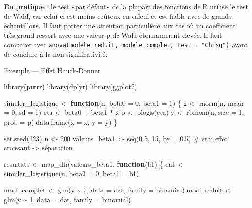 \documentclass[
  french,
  letterpaper,
  DIV=11,
  numbers=noendperiod]{scrreprt}
\newenvironment{Shaded}{\begin{snugshade}}{\end{snugshade}}
\newcommand{\AttributeTok}[1]{\textcolor[rgb]{0.40,0.45,0.13}{#1}}
\newcommand{\CommentTok}[1]{\textcolor[rgb]{0.37,0.37,0.37}{#1}}
\newcommand{\ControlFlowTok}[1]{\textcolor[rgb]{0.00,0.23,0.31}{\textbf{#1}}}
\newcommand{\DecValTok}[1]{\textcolor[rgb]{0.68,0.00,0.00}{#1}}
\newcommand{\FloatTok}[1]{\textcolor[rgb]{0.68,0.00,0.00}{#1}}
\newcommand{\FunctionTok}[1]{\textcolor[rgb]{0.28,0.35,0.67}{#1}}
\newcommand{\NormalTok}[1]{\textcolor[rgb]{0.00,0.23,0.31}{#1}}
\newcommand{\OtherTok}[1]{\textcolor[rgb]{0.00,0.23,0.31}{#1}}
\newcommand{\SpecialCharTok}[1]{\textcolor[rgb]{0.37,0.37,0.37}{#1}}
\begin{document}
\textbf{En pratique} : le test «par défaut» de la plupart des fonctions
de R utilise le test de Wald, car celui-ci est moins coûteux en calcul
et est fiable avec de grands échantillons. Il faut porter une attention
particulière aux cas où un coefficient très grand ressort avec une
valeur-p de Wald étonnamment élevée. Il faut comparer avec
\texttt{anova(modele\_reduit,\ modele\_complet,\ test\ =\ "Chisq")}
avant de conclure à la non-significativité.

{Exemple --- Effet Hauck-Donner}

\begin{Shaded}
\begin{Highlighting}[]
\FunctionTok{library}\NormalTok{(purrr)}
\FunctionTok{library}\NormalTok{(dplyr)}
\FunctionTok{library}\NormalTok{(ggplot2)}

\NormalTok{simuler\_logistique }\OtherTok{\textless{}{-}} \ControlFlowTok{function}\NormalTok{(n, }\AttributeTok{beta0 =} \DecValTok{0}\NormalTok{, }\AttributeTok{beta1 =} \DecValTok{1}\NormalTok{) \{}
\NormalTok{  x }\OtherTok{\textless{}{-}} \FunctionTok{rnorm}\NormalTok{(n, }\AttributeTok{mean =} \DecValTok{0}\NormalTok{, }\AttributeTok{sd =} \DecValTok{1}\NormalTok{)}
\NormalTok{  eta }\OtherTok{\textless{}{-}}\NormalTok{ beta0 }\SpecialCharTok{+}\NormalTok{ beta1 }\SpecialCharTok{*}\NormalTok{ x}
\NormalTok{  p }\OtherTok{\textless{}{-}} \FunctionTok{plogis}\NormalTok{(eta)}
\NormalTok{  y }\OtherTok{\textless{}{-}} \FunctionTok{rbinom}\NormalTok{(n, }\AttributeTok{size =} \DecValTok{1}\NormalTok{, }\AttributeTok{prob =}\NormalTok{ p)}
  \FunctionTok{data.frame}\NormalTok{(}\AttributeTok{x =}\NormalTok{ x, }\AttributeTok{y =}\NormalTok{ y)}
\NormalTok{\}}

\FunctionTok{set.seed}\NormalTok{(}\DecValTok{123}\NormalTok{)}
\NormalTok{n }\OtherTok{\textless{}{-}} \DecValTok{200}
\NormalTok{valeurs\_beta1 }\OtherTok{\textless{}{-}} \FunctionTok{seq}\NormalTok{(}\FloatTok{0.5}\NormalTok{, }\DecValTok{15}\NormalTok{, }\AttributeTok{by =} \FloatTok{0.5}\NormalTok{) }\CommentTok{\# vrai effet croissant {-}\textgreater{} séparation}

\NormalTok{resultats }\OtherTok{\textless{}{-}} \FunctionTok{map\_dfr}\NormalTok{(valeurs\_beta1, }\ControlFlowTok{function}\NormalTok{(b1) \{}
\NormalTok{  dat }\OtherTok{\textless{}{-}} \FunctionTok{simuler\_logistique}\NormalTok{(n, }\AttributeTok{beta0 =} \DecValTok{0}\NormalTok{, }\AttributeTok{beta1 =}\NormalTok{ b1)}

\NormalTok{  mod\_complet }\OtherTok{\textless{}{-}} \FunctionTok{glm}\NormalTok{(y }\SpecialCharTok{\textasciitilde{}}\NormalTok{ x, }\AttributeTok{data =}\NormalTok{ dat, }\AttributeTok{family =}\NormalTok{ binomial)}
\NormalTok{  mod\_reduit }\OtherTok{\textless{}{-}} \FunctionTok{glm}\NormalTok{(y }\SpecialCharTok{\textasciitilde{}} \DecValTok{1}\NormalTok{, }\AttributeTok{data =}\NormalTok{ dat, }\AttributeTok{family =}\NormalTok{ binomial)}


\end{Highlighting}
\end{Shaded}
\end{document}
